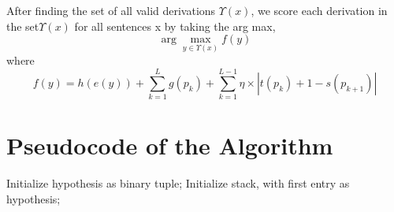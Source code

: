 \documentclass{article}
\begin{document}
	 After finding the set of all valid derivations $ \Upsilon (x) $, we score each derivation in the set$\Upsilon (x)$ for all sentences x by taking the arg max, \[\arg \max_{y \in \Upsilon (x)}  f(y)\]
	 where \[f(y) = h(e(y)) + \sum_{k=1}^{L}g(p_k) + \sum_{k=1}^{L-1} \eta \times  |t(p_k) + 1 - s(p_{k+1})| \]
	 
\newpage
\section{Pseudocode of the Algorithm}

\begin{algorithm}[H]
	Initialize hypothesis as binary tuple;
	Initialize stack, with first entry as hypothesis;
	
	
\end{algorithm}
\end{document}
